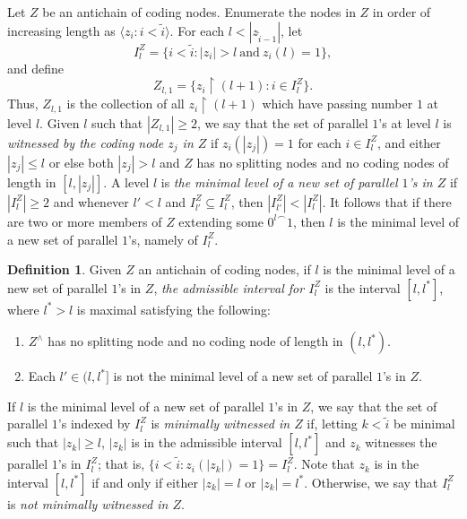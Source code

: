 \documentclass{amsart}
\theoremstyle{remark}
\theoremstyle{definition}
\newtheorem{defn}[thm]{Definition}
\theoremstyle{remark}
\newcommand{\sse}{\subseteq}
\newcommand{\re}{\restriction}
\newcommand{\lgl}{\langle}
\newcommand{\rgl}{\rangle}
\begin{document}
Let $Z$ be an antichain of coding nodes.
Enumerate the nodes in $Z$  in order of increasing length as $\lgl z_i:i< \tilde{i}\rgl$.
For each $l< |z_{\tilde{i}-1}|$,
let
\begin{equation}
I_l^Z=\{i<\tilde{i}:|z_i|>l\mathrm{\ and\ } z_i(l)=1 \},
\end{equation}
and  define
\begin{equation}
Z_{l,1}=\{z_i\re(l+1):i\in I^Z_l\}.
\end{equation}
Thus, $Z_{l,1}$ is the collection of all $z_i\re(l+1)$ which have passing number $1$ at level $l$.
Given $l$ such that  $|Z_{l,1}|\ge 2$,
we say that the set
of parallel $1$'s
at level $l$ is {\em witnessed by the coding node $z_j$   in $Z$}
if $z_i(|z_j|)=1$ for each $i\in I_l^Z$, and
 either $|z_j|\le l$
or else
both $|z_j|> l$ and
 $Z$ has no splitting nodes and no coding nodes of length in $[l,|z_j|]$.
A level $l$
is
{\em the minimal level of a new set  of parallel $1$'s in $Z$} if
$|I^Z_l|\ge 2$ and
whenever
 $l'<l$ and $I^Z_{l'}\sse I^Z_l$,
then $|I^Z_{l'}|<|I^Z_l|$.
It follows that if there are two or more members of $Z$
extending some ${0^l}^{\frown}1$,
then $l$ is the minimal level of a new set of parallel $1$'s,
namely of $I_l^Z$.



\begin{defn}\label{defn.admint}
Given $Z$ an antichain  of coding nodes,
if $l$ is the minimal level of a new set of parallel $1$'s in $Z$, {\em the  admissible interval for $I^Z_l$}
is the interval $[l,l^*]$, where $l^*> l$ is maximal satisfying the following:
\begin{enumerate}
\item
$Z^{\wedge}$ has no
 splitting node and no coding node  of length  in $(l,l^*)$.
\item
Each $l'\in (l,l^*]$
 is not the minimal level of a new set of parallel $1$'s in $Z$.
\end{enumerate}


If $l$ is the minimal level of a new set of parallel $1$'s in $Z$, we say that the set of parallel $1$'s indexed by
$I_l^Z$ is  {\em minimally witnessed in $Z$} if,
letting  $k<\tilde{i}$ be minimal such that
$|z_k|\ge l$,
$|z_k|$ is in the admissible interval $[l,l^*]$
and $z_k$ witnesses the parallel $1$'s in $I^Z_l$;
that is,
$\{i< \tilde{i}:z_i(|z_k|)=1\}=I^Z_l$.
Note that $z_k$ is in the interval $[l,l^*]$ if and only if either $|z_k|=l$ or $|z_k|=l^*$.
Otherwise, we say that $I^Z_l$ is {\em not minimally witnessed in $Z$}.
\end{defn}
\end{document}

